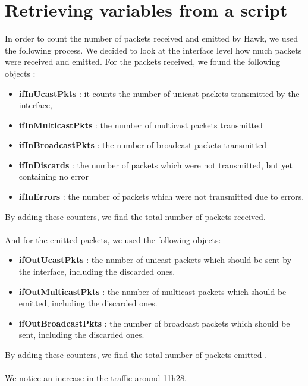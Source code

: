 \documentclass[a4paper,titlepage]{article}
\begin{document}
\section{Retrieving variables from a script}
In order to count the number of packets received and emitted by Hawk, we used the following process. 
We decided to look at the interface level how much packets were received and emitted. For the packets received, we found the following objects :
\begin{itemize}
\item \textbf{ifInUcastPkts} : it counts the number of unicast packets transmitted by the interface,
\item \textbf{ifInMulticastPkts} :  the number of multicast packets transmitted
\item \textbf{ifInBroadcastPkts} : the number of broadcast packets transmitted
\item \textbf{ifInDiscards} : the number of packets which were not transmitted, but yet containing no error
\item \textbf{ifInErrors} : the number of packets which were not transmitted due to errors. 
\end{itemize}
By adding these counters, we find the total number of packets received. 
\paragraph{}
And for the emitted packets, we used the following objects:
\begin{itemize}
\item \textbf{ifOutUcastPkts} : the number of unicast packets which should be sent by the interface, including the discarded ones.
\item \textbf{ifOutMulticastPkts} : the number of multicast packets which should be emitted, including the discarded ones.
\item \textbf{ifOutBroadcastPkts} : the number of broadcast packets which should be sent, including the discarded ones.
\end{itemize}  
By adding these counters, we find the total number of packets emitted .

\paragraph{}
We notice an increase in the traffic around 11h28.
\newpage
\end{document}
